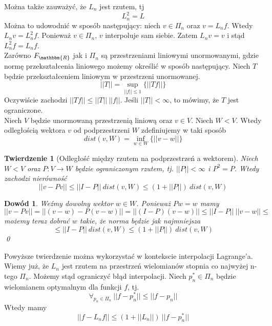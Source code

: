 \documentclass{article}
\newtheorem{twr}{Twierdzenie}
\newtheorem*{dd}{Dowód}
\begin{document}
Można także zauważyć, że $L_n$ jest rzutem, tj
\begin{equation*}
L_n^2 = L
\end{equation*}
Można to udowodnić w sposób następujący: niech $v \in \Pi_n$ oraz $v = L_n f$. Wtedy $L_n v = L_n^2 f$. Ponieważ $v \in \Pi_n$, $v$ interpoluje sam siebie. Zatem $L_n v = v$ i stąd $L_n^2 f = L_n f$.\\
Zarówno $F_{\mathbbm{R}}$ jak i $\Pi_n$ są przestrzeniami liniowymi unormowanymi, gdzie normę przekształcenia liniowego możemy określić w sposób następujący. Niech $T$ będzie przekształceniem liniowym w przestrzeni unormowanej.
\begin{equation*}
||T|| = \sup_{||f|| \le 1} \{||T f||\}
\end{equation*}
Oczywiście zachodzi $||Tf|| \le ||T||\ ||f||$.
Jeśli $||T|| < \infty$, to mówimy, że $T$ jest ograniczone.\\

Niech $V$ będzie unormowaną przestrzenią liniową oraz $v \in V$. Niech $W < V$. Wtedy odległością wektora $v$ od podprzestrzeni $W$ zdefiniujemy w taki sposób
\begin{equation*}
dist(v, W) = \inf_{w \in W} \{||v - w||\}
\end{equation*}
\begin{twr}[Odległość między rzutem na podprzestrzeń a wektorem]
Niech $W < V$ oraz $P : V \to W$ będzie ograniczonym rzutem, tj. $||P|| < \infty$ i $P^2 = P$. Wtedy zachodzi nierówność
\begin{equation*}
||v - Pv|| \le ||I - P|| \ dist(v, W) \le (1 + ||P||) \ dist(v, W)
\end{equation*}
\end{twr}
\begin{dd}
\normalfont 
Weźmy dowolny wektor $w \in W$. Ponieważ $Pw = w$ mamy
\begin{equation*}
||v - Pv|| = ||(v - w) - P(v - w)|| = ||(I - P)(v - w)|| \le ||I - P|| \ ||v - w|| \le 
\end{equation*}
możemy teraz dobrać $w$ takie, że norma będzie jak najmniejsza
\begin{equation*}
 \le ||I - P|| \ dist(v, W) \le (1 + ||P||) \ dist(v, W)
\end{equation*} 
\qed
\end{dd}
Powyższe twierdzenie można wykorzystać w kontekscie interpolacji Lagrange'a. Wiemy już, że $L_n$ jest rzutem na przestrzeń wielomianów stopnia co najwyżej n-tego $\Pi_n$. Możemy stąd ograniczyć błąd interpolacji. Niech $p_n^{*} \in \Pi_n$ będzie wielomianem optymalnym dla funkcji $f$, tj. 
\begin{equation*}
\forall_{p_n \in \Pi_n} \ ||f - p_n^{*}|| \le ||f - p_n||
\end{equation*} 
Wtedy mamy
\begin{equation*}
||f - L_n f|| \le (1 + ||L_n||) \ ||f - p_n^{*}||
\end{equation*}
\end{document}
